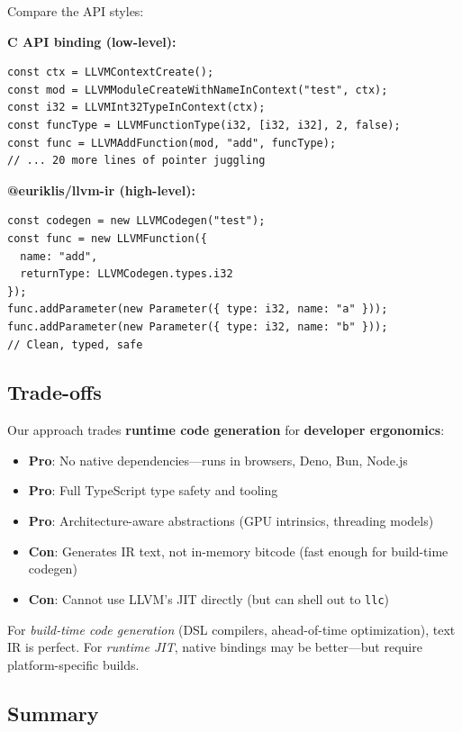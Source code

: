 \documentclass[11pt]{article}
\begin{document}
Compare the API styles:

\textbf{C API binding (low-level):}
\begin{lstlisting}[style=ts]
const ctx = LLVMContextCreate();
const mod = LLVMModuleCreateWithNameInContext("test", ctx);
const i32 = LLVMInt32TypeInContext(ctx);
const funcType = LLVMFunctionType(i32, [i32, i32], 2, false);
const func = LLVMAddFunction(mod, "add", funcType);
// ... 20 more lines of pointer juggling
\end{lstlisting}

\textbf{@euriklis/llvm-ir (high-level):}
\begin{lstlisting}[style=ts]
const codegen = new LLVMCodegen("test");
const func = new LLVMFunction({
  name: "add",
  returnType: LLVMCodegen.types.i32
});
func.addParameter(new Parameter({ type: i32, name: "a" }));
func.addParameter(new Parameter({ type: i32, name: "b" }));
// Clean, typed, safe
\end{lstlisting}

\subsection{Trade-offs}

Our approach trades \textbf{runtime code generation} for \textbf{developer ergonomics}:

\begin{itemize}[noitemsep]
  \item \textbf{Pro}: No native dependencies—runs in browsers, Deno, Bun, Node.js
  \item \textbf{Pro}: Full TypeScript type safety and tooling
  \item \textbf{Pro}: Architecture-aware abstractions (GPU intrinsics, threading models)
  \item \textbf{Con}: Generates IR text, not in-memory bitcode (fast enough for build-time codegen)
  \item \textbf{Con}: Cannot use LLVM's JIT directly (but can shell out to \texttt{llc})
\end{itemize}

For \emph{build-time code generation} (DSL compilers, ahead-of-time optimization), text IR is perfect. For \emph{runtime JIT}, native bindings may be better—but require platform-specific builds.

\subsection{Summary}
\end{document}

